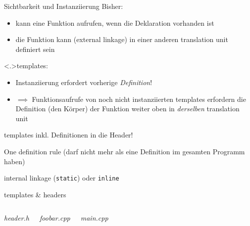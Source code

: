 \begin{frame}[fragile]{Sichtbarkeit und Instanziierung}
	\alert<+>{Bisher:}
	\begin{itemize}
		\item kann eine Funktion aufrufen, wenn die Deklaration vorhanden ist
		\item die Funktion kann (external linkage) in einer anderen translation unit definiert sein
	\end{itemize}
	
	\onslide<+->
	\vspace{0.5em}
	
	\alert<.>{templates:}
	\begin{itemize}
		\item Instanziierung erfordert vorherige \emph{Definition}!
		\item $\implies$ Funktionsaufrufe von noch nicht instanziierten templates erfordern die Definition (den Körper) der Funktion weiter oben in \emph{derselben} translation unit
	\end{itemize}
	
	\onslide<+->
	\vspace{0.5em}
	\begin{description}[leftmargin=3.5em]
		\item[\emph{common solution}] templates inkl. Definitionen in die Header!\\
		\item[\emph{Problem}] One definition rule {\tiny (darf nicht mehr als eine Definition im gesamten Programm haben) }\\
		\item[\emph{Umgehung}] internal linkage (\verb|static|) oder \verb|inline|
	\end{description}
\end{frame}

\begin{frame}{templates \& headers}
	\begin{columns}[t]
			\emph{header.h}
			
		
		\pause
			\emph{foobar.cpp}
			
			\pause
			\emph{main.cpp}
			
	\end{columns}
\end{frame}


